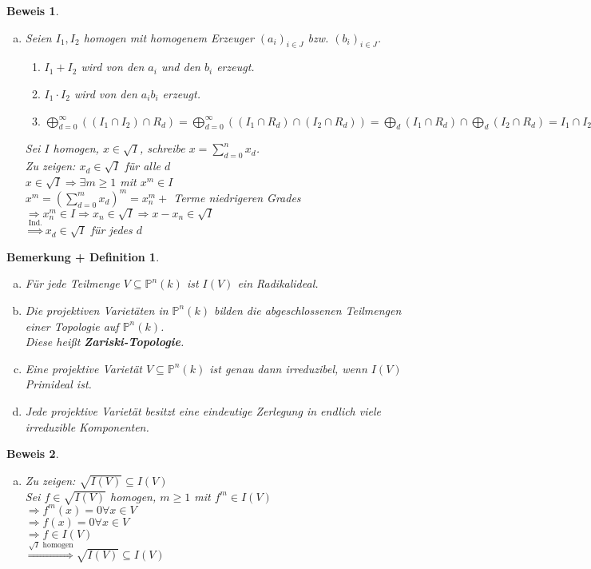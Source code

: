 \documentclass[a4paper,12pt]{report}
\theoremstyle{break}
\newtheorem{BemDef}[Def]{Bemerkung + Definition}
\theoremstyle{nonumberbreak}
\newtheorem{Bew}{Beweis}
\theoremstyle{nonumberplain}
\newcommand{\emp}[1]{\textbf{\emph{#1}}}
\newcommand{\begriff}[1]{{\index{#1}}\emp{#1}}
\newcommand{\Sum}{\sum\limits}
\newcommand{\IP}{\mathbb{P}}%
\begin{document}
\begin{Bew}
\begin{enumerate}[a)]
\item[g)]
	Seien $I_1,I_2$ homogen mit homogenem Erzeuger $(a_i)_{i\in J}$ bzw. $(b_i)_{i\in J}$.
	\begin{enumerate}[$\bullet$]
	\item
		$I_1+I_2$ wird von den $a_i$ und den $b_i$ erzeugt.
	\item
		$I_1\cdot I_2$ wird von den $a_ib_i$ erzeugt.
	\item
		$\bigoplus\limits_{d=0}^{\infty}((I_1\cap I_2)\cap R_d)=\bigoplus\limits_{d=0}^{\infty}((I_1\cap R_d)\cap (I_2\cap R_d)) = \bigoplus\limits_d(I_1\cap R_d)\cap \bigoplus\limits_d(I_2\cap R_d)=I_1\cap I_2$
	\end{enumerate}
	Sei $I$ homogen, $x\in \sqrt{I}$, schreibe $x=\Sum_{d=0}^n x_d$.\\
	\emph{Zu zeigen:} $x_d\in\sqrt{I}$ f\"ur alle $d$\\
	$x\in \sqrt{I} \Rightarrow \exists m\ge 1$ mit $x^m\in I$\\
	$x^m=(\Sum_{d=0}^m x_d)^m = x_n^m +$ Terme niedrigeren Grades\\
	$\Rightarrow x_n^m\in I\Rightarrow x_n\in \sqrt{I} \Rightarrow x-x_n\in\sqrt I$\\
	$\overset{\text{Ind.}}{\Longrightarrow}x_d\in\sqrt I$ f\"ur jedes $d$
\end{enumerate}\end{Bew}

\begin{BemDef}\label{bem10.6}\begin{enumerate}[a)]
\item
	F\"ur jede Teilmenge $V\subseteq \IP^n(k)$ ist $I(V)$ ein Radikalideal.
	
\item
	Die projektiven Variet\"aten in $\IP^n(k)$ bilden die abgeschlossenen Teilmengen einer Topologie auf $\IP^n(k)$.\\
	Diese hei\ss t \begriff{Zariski-Topologie}.

\item
	Eine projektive Variet\"at $V\subseteq\IP^n(k)$ ist genau dann irreduzibel, wenn $I(V)$ Primideal ist.

\item
	Jede projektive Variet\"at besitzt eine eindeutige Zerlegung in endlich viele irreduzible Komponenten.
\end{enumerate}\end{BemDef}

\begin{Bew}\begin{enumerate}[a)]\item
\emph{Zu zeigen:} $\sqrt{I(V)}\subseteq I(V)$\\
Sei $f\in \sqrt{I(V)}$ homogen, $m\ge 1$ mit $f^m\in I(V)$\\
$\Rightarrow f^m(x)=0\forall x\in V$\\
$\Rightarrow f(x)=0\forall x\in V$\\
$\Rightarrow f\in I(V)$\\
$\overset{\sqrt I\text{ homogen}}{\Longrightarrow} \sqrt{I(V)}\subseteq I(V)$
\end{enumerate}\end{Bew}
\end{document}
